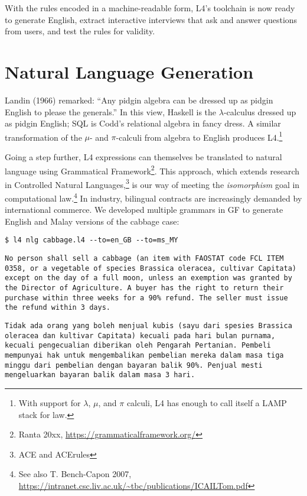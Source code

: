 \documentclass{IOS-Book-Article}
\begin{document}
\noindent With the rules encoded in a machine-readable form, L4's toolchain is now ready to generate English, extract interactive interviews that ask and answer questions from users, and test the rules for validity.

\section{Natural Language Generation}

Landin (1966) remarked: ``Any pidgin algebra can be dressed up as pidgin English to please the generals.'' In this view, Haskell is the $\lambda$-calculus dressed up as pidgin English; SQL is Codd's relational algebra in fancy dress. A similar transformation of the $\mu$- and $\pi$-calculi from algebra to English produces L4.\footnote{With support for $\lambda$, $\mu$, and $\pi$ calculi, L4 has enough to call itself a LAMP stack for law.}

Going a step further, L4 expressions can themselves be translated to natural language using Grammatical Framework\footnote{Ranta 20xx, \url{https://grammaticalframework.org/}}.
This approach, which extends research in Controlled Natural Languages,\footnote{ACE and ACErules} is our way of meeting the \textit{isomorphism} goal in computational law.\footnote{See also T. Bench-Capon 2007, \url{https://intranet.csc.liv.ac.uk/~tbc/publications/ICAILTom.pdf}}
In industry, bilingual contracts are increasingly demanded by international commerce.
We developed multiple grammars in GF to generate English and Malay versions of the cabbage case:

\begin{verbatim}$ l4 nlg cabbage.l4 --to=en_GB --to=ms_MY\end{verbatim}

\noindent \texttt{No person shall sell a cabbage (an item with FAOSTAT code FCL ITEM 0358, or a vegetable of species Brassica oleracea, cultivar Capitata) except on the day of a full moon, unless an exemption was granted by the Director of Agriculture. A buyer has the right to return their purchase within three weeks for a 90\% refund. The seller must issue the refund within 3 days.}

\medskip
\noindent \texttt{Tidak ada orang yang boleh menjual kubis (sayu dari spesies Brassica oleracea dan kultivar Capitata) kecuali pada hari bulan purnama, kecuali pengecualian diberikan oleh Pengarah Pertanian. Pembeli mempunyai hak untuk mengembalikan pembelian mereka dalam masa tiga minggu dari pembelian dengan bayaran balik 90\%. Penjual mesti mengeluarkan bayaran balik dalam masa 3 hari.}
\end{document}
